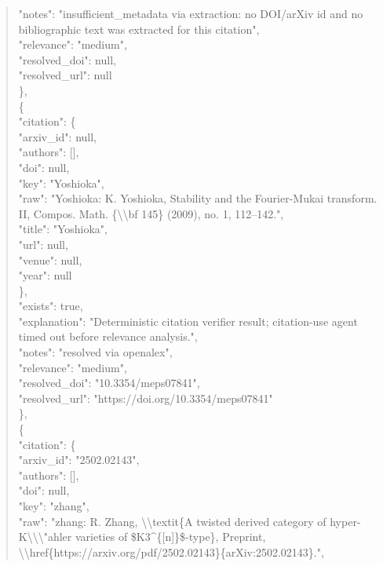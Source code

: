 \documentclass[11pt]{article}
\begin{document}
\begin{quote}
      "notes": "insufficient\_metadata via extraction: no DOI/arXiv id and no bibliographic text was extracted for this citation",\\
      "relevance": "medium",\\
      "resolved\_doi": null,\\
      "resolved\_url": null\\
    \},\\
    \{\\
      "citation": \{\\
        "arxiv\_id": null,\\
        "authors": [],\\
        "doi": null,\\
        "key": "Yoshioka",\\
        "raw": "Yoshioka: K. Yoshioka, Stability and the Fourier-Mukai transform. II, Compos. Math. \{\textbackslash{}\textbackslash{}bf 145\} (2009), no. 1, 112--142.",\\
        "title": "Yoshioka",\\
        "url": null,\\
        "venue": null,\\
        "year": null\\
      \},\\
      "exists": true,\\
      "explanation": "Deterministic citation verifier result; citation-use agent timed out before relevance analysis.",\\
      "notes": "resolved via openalex",\\
      "relevance": "medium",\\
      "resolved\_doi": "10.3354/meps07841",\\
      "resolved\_url": "https://doi.org/10.3354/meps07841"\\
    \},\\
    \{\\
      "citation": \{\\
        "arxiv\_id": "2502.02143",\\
        "authors": [],\\
        "doi": null,\\
        "key": "zhang",\\
        "raw": "zhang: R. Zhang, \textbackslash{}\textbackslash{}textit\{A twisted derived category of hyper-K\textbackslash{}\textbackslash{}\textbackslash{}"ahler varieties of \$K3\^{}\{[n]\}\$-type\}, Preprint, \textbackslash{}\textbackslash{}href\{https://arxiv.org/pdf/2502.02143\}\{arXiv:2502.02143\}.",\\

\end{quote}
\end{document}
